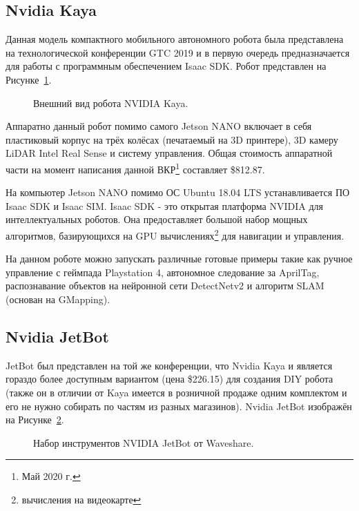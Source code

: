 \subsection{Nvidia Kaya}
Данная модель компактного мобильного автономного робота была представлена на технологической конференции GTC 2019 и в первую очередь предназначается для работы с программным обеспечением Isaac SDK. Робот представлен на Рисунке~\ref{fig:kaya}.

\begin{figure}[ht]
  \caption{Внешний вид робота NVIDIA Kaya.}\label{fig:kaya}
\end{figure}

Аппаратно данный робот помимо самого Jetson NANO включает в себя пластиковый корпус на трёх колёсах (печатаемый на 3D принтере), 3D камеру LiDAR Intel Real Sense и систему управления. Общая стоимость аппаратной части на момент написания данной ВКР\footnote{Май 2020 г.} составляет \$812.87\cite{kaya-hardware}.

На компьютер Jetson NANO помимо ОС Ubuntu 18.04 LTS устанавливается ПО Isaac SDK и Isaac SIM. Isaac SDK - это открытая платформа NVIDIA для интеллектуальных роботов. Она предоставляет большой набор мощных алгоритмов, базирующихся на GPU вычислениях\footnote{вычисления на видеокарте} для навигации и управления.

На данном роботе можно запускать различные готовые примеры такие как ручное управление с геймпада Playstation 4, автономное следование за AprilTag, распознавание объектов на нейронной сети DetectNetv2 и алгоритм SLAM (основан на GMapping)\cite{kaya-software}.

\subsection{Nvidia JetBot}
JetBot был представлен на той же конференции, что Nvidia Kaya и является гораздо более доступным вариантом (цена \$226.15) для создания DIY робота (также он в отличии от Kaya имеется в розничной продаже одним комплектом и его не нужно собирать по частям из разных магазинов). Nvidia JetBot изображён на Рисунке~\ref{fig:jetbot-waveshare}\cite{jetbot-shop}.

\begin{figure}[ht]
  \caption{Набор инструментов NVIDIA JetBot от Waveshare.}\label{fig:jetbot-waveshare}
\end{figure}


